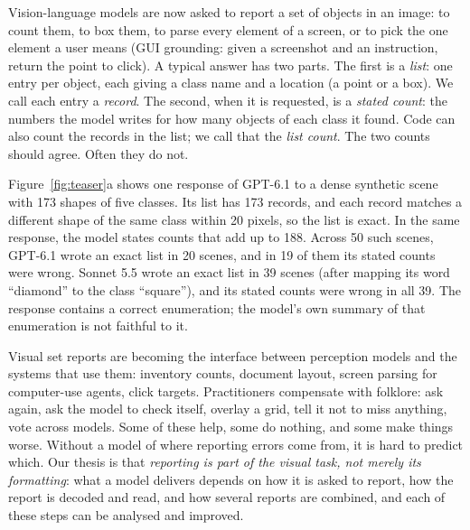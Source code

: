 Vision-language models are now asked to report a set of objects in an image: to count them, to box them, to parse every element of a screen, or to pick the one element a user means (GUI grounding: given a screenshot and an instruction, return the point to click). A typical answer has two parts. The first is a \emph{list}: one entry per object, each giving a class name and a location (a point or a box). We call each entry a \emph{record}. The second, when it is requested, is a \emph{stated count}: the numbers the model writes for how many objects of each class it found. Code can also count the records in the list; we call that the \emph{list count}. The two counts should agree. Often they do not.

Figure~\ref{fig:teaser}a shows one response of GPT-6.1 to a dense synthetic scene with 173 shapes of five classes. Its list has 173 records, and each record matches a different shape of the same class within 20 pixels, so the list is exact. In the same response, the model states counts that add up to 188. Across 50 such scenes, GPT-6.1 wrote an exact list in 20 scenes, and in 19 of them its stated counts were wrong. Sonnet 5.5 wrote an exact list in 39 scenes (after mapping its word ``diamond'' to the class ``square''), and its stated counts were wrong in all 39. The response contains a correct enumeration; the model's own summary of that enumeration is not faithful to it.

Visual set reports are becoming the interface between perception models and the systems that use them: inventory counts, document layout, screen parsing for computer-use agents, click targets. Practitioners compensate with folklore: ask again, ask the model to check itself, overlay a grid, tell it not to miss anything, vote across models. Some of these help, some do nothing, and some make things worse. Without a model of where reporting errors come from, it is hard to predict which. Our thesis is that \emph{reporting is part of the visual task, not merely its formatting}: what a model delivers depends on how it is asked to report, how the report is decoded and read, and how several reports are combined, and each of these steps can be analysed and improved.

